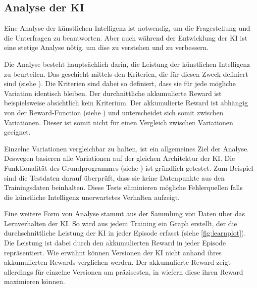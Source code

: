 \subsection{Analyse der KI}\label{sub:d_reflex_analys} Eine
Analyse der künstlichen Intelligenz ist notwendig, um die Fragestellung und die
Unterfragen zu beantworten. Aber auch während der Entwicklung der KI ist eine
stetige Analyse nötig, um dise zu verstehen und zu verbessern.

Die Analyse besteht hauptsächlich darin, die Leistung der künstlichen
Intelligenz zu beurteilen. Das geschieht mittels den Kriterien, die für diesen
Zweck definiert sind (siehe ). Die Kriterien sind dabei so
definiert, dass sie für jede mögliche Variation identisch bleiben. Der
durchnittliche akkumulierte Reward ist beispielsweise absichtlich kein
Kriterium. Der akkumulierte Reward ist abhängig von der Reward-Function (siehe
) und unterscheidet sich somit zwischen Variationen.
Dieser ist somit nicht für einen Vergleich zwischen Variationen geeignet.

Einzelne Variationen vergleichbar zu halten, ist ein allgemeines Ziel der
Analyse. Deswegen basieren alle Variationen auf der gleichen Architektur der KI.
Die Funktionalität des Grundprogrammes (siehe ) ist
gründlich getestet. Zum Beispiel sind die Testdaten darauf überprüft, dass sie
keine Datenpunkte aus den Trainingsdaten beinhalten. Diese Tests eliminieren
mögliche Fehlerquellen falls die künstliche Intelligenz unerwartetes Verhalten
aufzeigt.

Eine weitere Form von Analyse stammt aus der Sammlung von Daten über das
Lernverhalten der KI. So wird aus jedem Training ein Graph erstellt, der die
durchschnittliche Leistung der KI in jeder Episode erfasst (siehe
\autoref{fig:learnplot}). Die Leistung ist dabei durch den akkumulierten Reward
in jeder Episode repräsentiert. Wie erwähnt können Versionen der KI nicht anhand
ihres akkumulierten Rewards verglichen werden. Der akkumulierte Reward zeigt
allerdings für einzelne Versionen am präzisesten, in wiefern diese ihren Reward
maximieren können.

